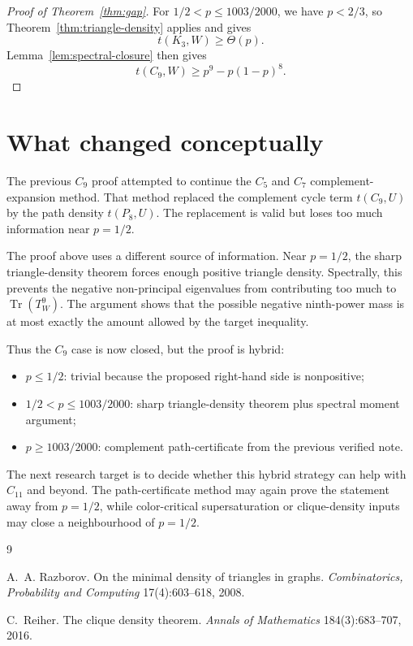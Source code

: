 \documentclass[11pt]{article}
\DeclareMathOperator{\Tr}{Tr}
\begin{document}
\begin{proof}[Proof of Theorem~\ref{thm:gap}]
For $1/2<p\le1003/2000$, we have $p<2/3$, so Theorem~\ref{thm:triangle-density} applies and gives
\[
        t(K_3,W)\ge\Theta(p).
\]
Lemma~\ref{lem:spectral-closure} then gives
\[
        t(C_9,W)\ge p^9-p(1-p)^8.
\]
\end{proof}

\section{What changed conceptually}

The previous $C_9$ proof attempted to continue the $C_5$ and $C_7$ complement-expansion method.  That method replaced the complement cycle term $t(C_9,U)$ by the path density $t(P_8,U)$.  The replacement is valid but loses too much information near $p=1/2$.

The proof above uses a different source of information.  Near $p=1/2$, the sharp triangle-density theorem forces enough positive triangle density.  Spectrally, this prevents the negative non-principal eigenvalues from contributing too much to $\Tr(T_W^9)$.  The argument shows that the possible negative ninth-power mass is at most exactly the amount allowed by the target inequality.

Thus the $C_9$ case is now closed, but the proof is hybrid:
\begin{itemize}[leftmargin=2em]
    \item $p\le1/2$: trivial because the proposed right-hand side is nonpositive;
    \item $1/2<p\le1003/2000$: sharp triangle-density theorem plus spectral moment argument;
    \item $p\ge1003/2000$: complement path-certificate from the previous verified note.
\end{itemize}

The next research target is to decide whether this hybrid strategy can help with $C_{11}$ and beyond.  The path-certificate method may again prove the statement away from $p=1/2$, while color-critical supersaturation or clique-density inputs may close a neighbourhood of $p=1/2$.

\begin{thebibliography}{9}

A.~A. Razborov.
\newblock On the minimal density of triangles in graphs.
\newblock \emph{Combinatorics, Probability and Computing} 17(4):603--618, 2008.

C.~Reiher.
\newblock The clique density theorem.
\newblock \emph{Annals of Mathematics} 184(3):683--707, 2016.

\end{thebibliography}
\end{document}
